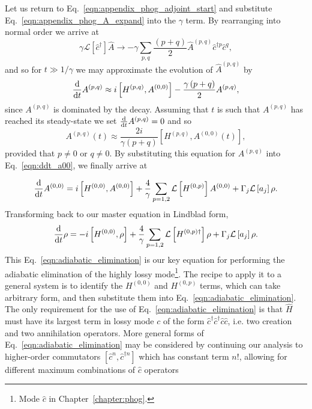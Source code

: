 \noindent Let us return to Eq.~\ref{eqn:appendix_phog_adjoint_start} and substitute Eq.~\ref{eqn:appendix_phog_A_expand} into the $\gamma$ term. By rearranging into normal order we arrive at
\begin{equation}
\gamma \mathcal{L}\left[\hat{c}^\dagger\right] \hat{A} \rightarrow - \gamma \sum_{p, q}\frac{\left(p + q\right)}{2} \hat{A}^{\left(p, q\right)} \hat{c}^{\dagger p} \hat{c}^q,
\end{equation} 
and so for $t \gg 1/\gamma$ we may approximate the evolution of $\hat{A}^{\left(p, q\right)}$ by
\begin{equation}
\frac{\mathrm{d}}{\mathrm{d}t} A^{\left(p, q\right)} \approx i \left[ H^{\left(p, q\right)}, A^{\left(0, 0\right)}\right] - \frac{\gamma \left(p + q\right)}{2} A^{\left(p, q\right)},
\end{equation}
since $A^{\left(p, q\right)}$ is dominated by the decay. Assuming that $t$ is such that $A^{\left(p, q\right)}$ has reached its steady-state we set $\frac{\mathrm{d}}{\mathrm{d}t} A^{\left(p, q\right)} = 0$ and so
\begin{equation}
A^{\left(p, q\right)} \left(t\right) \approx \frac{2 i}{\gamma \left(p + q\right)} \left[H^{\left(p, q\right)}, A^{\left(0, 0\right)}\left(t\right)\right],
\end{equation}
provided that $p \ne 0$ or $q \ne 0$. By substituting this equation for $A^{\left(p, q\right)}$ into Eq.~\ref{eqn:ddt_a00}, we finally arrive at

\begin{equation}
\ddt A^{\left(0, 0\right)} = i \left[ H^{\left(0, 0\right)}, A^{\left(0, 0\right)}\right] + \frac{4}{\gamma} \sum_{p = {1, 2}} \mathcal{L}\left[ H^{\left(0, p\right)} \right] A^{\left(0, 0\right)} + \Gamma_j \mathcal{L}\left[a_j\right] \rho. %
\end{equation}
Transforming back to our master equation in Lindblad form,
\begin{equation}\label{eqn:adiabatic_elimination}
\frac{\mathrm{d}}{\mathrm{d}t} \rho = - i \left[ H^{\left(0, 0\right)}, \rho\right] + \frac{4}{\gamma} \sum_{p = 1, 2} \mathcal{L} \left[H^{\left(0, p\right)\dagger}\right] \rho + \Gamma_j \mathcal{L}\left[a_j\right] \rho.
\end{equation}
This Eq.~\ref{eqn:adiabatic_elimination} is our key equation for performing the adiabatic elimination of the highly lossy mode\footnote{Mode $\hat{c}$ in Chapter~\ref{chapter:phog}.}. The recipe to apply it to a general system is to identify the $H^{\left(0, 0\right)}$ and $H^{\left(0, p\right)}$ terms, which can take arbitrary form, and then substitute them into Eq.~\ref{eqn:adiabatic_elimination}. The only requirement for the use of Eq.~\ref{eqn:adiabatic_elimination} is that $\hat{H}$ must have its largest term in lossy mode $c$ of the form $\hat{c}^\dagger \hat{c}^\dagger \hat{c} \hat{c}$, i.e. two creation and two annihilation operators. More general forms of Eq.~\ref{eqn:adiabatic_elimination} may be considered by continuing our analysis to higher-order commutators $\left[ \hat{c}^n, \hat{c}^{\dagger n}\right]$ which has constant term $n!$, allowing for different maximum combinations of $\hat{c}$ operators 

